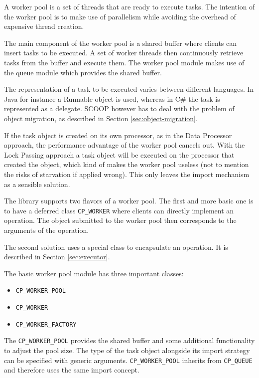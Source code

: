A worker pool is a set of threads that are ready to execute tasks.
The intention of the worker pool is to make use of parallelism while avoiding the overhead of expensive thread creation.

The main component of the worker pool is a shared buffer where clients can insert tasks to be executed.
A set of worker threads then continuously retrieve tasks from the buffer and execute them.
The worker pool module makes use of the queue module which provides the shared buffer.

The representation of a task to be executed varies between different languages.
In Java for instance a Runnable object is used, whereas in C\# the task is represented as a delegate.
SCOOP however has to deal with the problem of object migration, as described in Section \ref{sec:object-migration}.

If the task object is created on its own processor, as in the Data Processor approach, the performance advantage of the worker pool cancels out.
With the Lock Passing approach a task object will be executed on the processor that created the object, which kind of makes the worker pool useless (not to mention the risks of starvation if applied wrong).
This only leaves the import mechanism as a sensible solution.

The library supports two flavors of a worker pool.
The first and more basic one is to have a deferred class \lstinline!CP_WORKER! where clients can directly implement an operation.
The object submitted to the worker pool then corresponds to the arguments of the operation.

The second solution uses a special class to encapsulate an operation.
It is described in Section \ref{sec:executor}.

The basic worker pool module has three important classes:
\begin{itemize}
 \item \lstinline!CP_WORKER_POOL!
 \item \lstinline!CP_WORKER!
 \item \lstinline!CP_WORKER_FACTORY!
\end{itemize}

The \lstinline!CP_WORKER_POOL! provides the shared buffer and some additional functionality to adjust the pool size.
The type of the task object alongside its import strategy can be specified with generic arguments.
\lstinline!CP_WORKER_POOL! inherits from \lstinline!CP_QUEUE! and therefore uses the same import concept.

